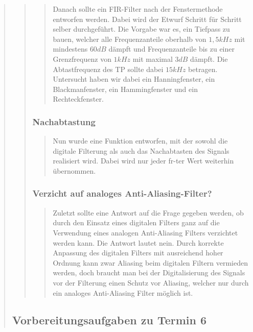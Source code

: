 \begin{quote}
\begin{quote}
\begin{quote}
		    Danach sollte ein FIR-Filter nach der Fenstermethode entworfen werden. Dabei
		    wird der Etwurf Schritt für Schritt selber durchgeführt. Die Vorgabe war es,
		    ein Tiefpass zu bauen, welcher alle Frequenzanteile oberhalb von $1,5 kHz$
		    mit mindestens $60 dB$ dämpft und Frequenzanteile bis zu einer Grenzfrequenz
		    von $1 kHz$ mit maximal $3 dB$ dämpft. Die Abtastfrequenz des TP sollte
		    dabei $15 kHz$ betragen. Untersucht haben wir dabei ein Hanningfenster, ein
		    Blackmanfenster, ein Hammingfenster und ein Rechteckfenster.
		    
		            
		            
		  \end{quote}          
		            
		  \subsubsection{Nachabtastung}
		  \begin{quote}
		            
		    Nun wurde eine Funktion entworfen, mit der sowohl die digitale Filterung als
		    auch das Nachabtasten des Signals realisiert wird. Dabei wird nur jeder
		    fr-ter Wert weiterhin übernommen.  
		 
		  \end{quote}
		  
		  \subsubsection{Verzicht auf analoges Anti-Aliasing-Filter?}
		  \begin{quote}
		  
		  Zuletzt sollte eine Antwort auf die Frage gegeben werden, ob durch den
		  Einsatz eines digitalen Filters ganz auf die Verwendung eines analogen
		  Anti-Aliasing Filters verzichtet werden kann. Die Antwort lautet nein. Durch
		  korrekte Anpassung des digitalen Filters mit ausreichend hoher Ordnung kann zwar 
		  Aliasing beim digitalen Filtern vermieden werden, doch braucht man bei der
		  Digitalisierung des Signals vor der Filterung einen Schutz vor Aliasing,
		  welcher nur durch ein analoges Anti-Aliasing Filter möglich ist.
		  
		  \end{quote}
	
	\end{quote}%
	
	
    \subsection{Vorbereitungsaufgaben zu Termin 6}
    \begin{quote}
    	

\end{quote}
\end{quote}
